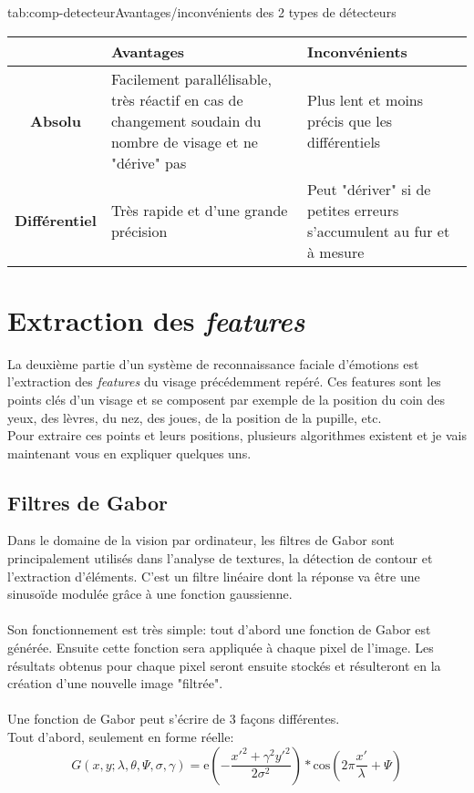 \documentclass[overfullbox, poster]{polytech/polytech}
\begin{document}
\begin{Table}{tab:comp-detecteur}{Avantages/inconvénients des 2 types de détecteurs}
	\begin{tabular}{|c|p{6cm}|p{6cm}|}
		\hline
		 &\textbf{Avantages} &\textbf{Inconvénients}\\\hline
		\textbf{Absolu} &Facilement parallélisable, très réactif en cas de changement soudain du nombre de visage et ne "dérive" pas &Plus lent et moins précis que les différentiels \\\hline
		\textbf{Différentiel} &Très rapide et d'une grande précision &Peut "dériver" si de petites erreurs s'accumulent au fur et à mesure\\
		\hline
	\end{tabular}
\end{Table}

\newpage
\section{Extraction des \textit{features}}
La deuxième partie d'un système de reconnaissance faciale d'émotions est l'extraction des \textit{features} du visage précédemment repéré. Ces features sont les points clés d'un visage et se composent par exemple de la position du coin des yeux, des lèvres, du nez, des joues, de la position de la pupille, etc. \\
Pour extraire ces points et leurs positions, plusieurs algorithmes existent et je vais maintenant vous en expliquer quelques uns.

\subsection{Filtres de Gabor}
Dans le domaine de la vision par ordinateur, les filtres de Gabor sont principalement utilisés dans l'analyse de textures, la détection de contour et l'extraction d'éléments. C'est un filtre linéaire dont la réponse va être une sinusoïde modulée grâce à une fonction gaussienne.\\
\\
Son fonctionnement est très simple: tout d'abord une fonction de Gabor est générée. Ensuite cette fonction sera appliquée à chaque pixel de l'image. Les résultats obtenus pour chaque pixel seront ensuite stockés et résulteront en la création d'une nouvelle image "filtrée".\\
\\
Une fonction de Gabor peut s'écrire de 3 façons différentes.\\
Tout d'abord, seulement en forme réelle:
\begin{equation}
G(x,y;\lambda ,\theta ,\Psi ,\sigma ,\gamma )=\mathrm{e}(- \frac{x'^2+\gamma ^2 y'^2}{2\sigma ^2})*\mathrm{cos}(2\pi \frac{x'}{\lambda}+\Psi)
\label{gabor_reel}
\end{equation}
\end{document}
